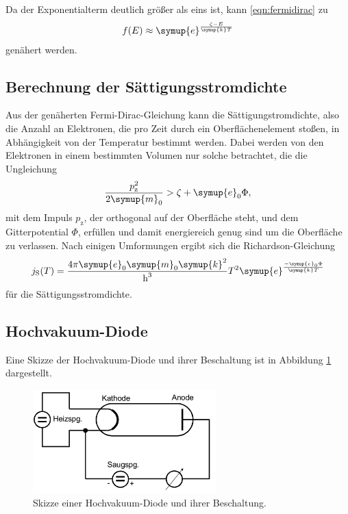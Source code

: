 \FloatBarrier

Da der Exponentialterm deutlich größer als eins ist, kann \ref{eqn:fermidirac}
zu
\begin{align}
  f(E) \approx \symup{e}^{\frac{\zeta-E}{\symup{k}T}}
  \label{eqn:fermidiracn}
\end{align}
genähert werden.

\subsection{Berechnung der Sättigungsstromdichte}

Aus der genäherten Fermi-Dirac-Gleichung kann die Sättigungstromdichte,
also die Anzahl an Elektronen, die pro Zeit durch ein Oberflächenelement
stoßen, in Abhängigkeit von der Temperatur bestimmt werden.
Dabei werden von den Elektronen in einem bestimmten Volumen nur solche
betrachtet, die die Ungleichung
\begin{align}
  \frac{p_\text{z}^2}{2\symup{m}_0} > \zeta + \symup{e}_0 \Phi,
\end{align}
mit dem Impuls $p_\text{z}$, der orthogonal auf der Oberfläche steht, und dem
Gitterpotential $\Phi$, erfüllen und damit energiereich genug sind um die
Oberfläche zu verlassen. Nach einigen Umformungen ergibt sich die
Richardson-Gleichung
\begin{align}
  j_\text{S}(T) = \frac{4\pi \symup{e}_0 \symup{m}_0 \symup{k}^2}{\text{h}^3} T^2
  \symup{e}^{\frac{-\symup{e}_0 \Phi}{\symup{k} T}}
  \label{eqn:richardson}
\end{align}
für die Sättigungsstromdichte.

\subsection{Hochvakuum-Diode}

Eine Skizze der Hochvakuum-Diode und ihrer Beschaltung ist in Abbildung
\ref{fig:hochvakuum} dargestellt.

\begin{figure}
  \centering
  \includegraphics[height=4cm]{SommerAlbum15/Diode.png}
  \caption{Skizze einer Hochvakuum-Diode und ihrer Beschaltung.\cite{anleitung}}
  \label{fig:hochvakuum}
\end{figure}

